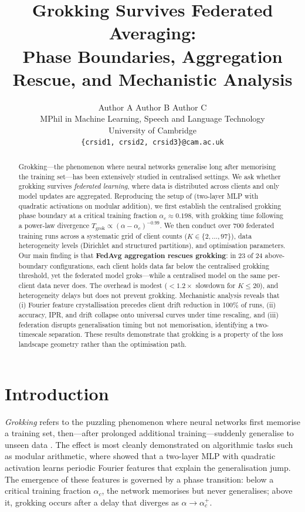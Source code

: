 \documentclass{article}
\title{Grokking Survives Federated Averaging: \\
Phase Boundaries, Aggregation Rescue, and Mechanistic Analysis}
\author{
  Author A \quad Author B \quad Author C \\
  MPhil in Machine Learning, Speech and Language Technology \\
  University of Cambridge \\
  \texttt{\{crsid1, crsid2, crsid3\}@cam.ac.uk}
}
\date{}
\begin{document}
\maketitle

\begin{abstract}
Grokking---the phenomenon where neural networks generalise long after memorising the training set---has been extensively studied in centralised settings.
We ask whether grokking survives \emph{federated learning}, where data is distributed across clients and only model updates are aggregated.
Reproducing the setup of \citet{gromov2023grokking} (two-layer MLP with quadratic activations on modular addition), we first establish the centralised grokking phase boundary at a critical training fraction $\alpha_c \approx 0.198$, with grokking time following a power-law divergence $T_{\mathrm{grok}} \propto (\alpha - \alpha_c)^{-0.99}$.
We then conduct over 700 federated training runs across a systematic grid of client counts ($K \in \{2, \ldots, 97\}$), data heterogeneity levels (Dirichlet and structured partitions), and optimisation parameters.
Our main finding is that \textbf{FedAvg aggregation rescues grokking}: in 23 of 24 above-boundary configurations, each client holds data far below the centralised grokking threshold, yet the federated model groks---while a centralised model on the same per-client data never does.
The overhead is modest ($<1.2\times$ slowdown for $K \leq 20$), and heterogeneity delays but does not prevent grokking.
Mechanistic analysis reveals that (i) Fourier feature crystallisation precedes client drift reduction in 100\% of runs, (ii) accuracy, IPR, and drift collapse onto universal curves under time rescaling, and (iii) federation disrupts generalisation timing but not memorisation, identifying a two-timescale separation.
These results demonstrate that grokking is a property of the loss landscape geometry rather than the optimisation path.
\end{abstract}


\section{Introduction}
\label{sec:intro}

\emph{Grokking} refers to the puzzling phenomenon where neural networks first memorise a training set, then---after prolonged additional training---suddenly generalise to unseen data \citep{power2022grokking}.
The effect is most cleanly demonstrated on algorithmic tasks such as modular arithmetic, where \citet{gromov2023grokking} showed that a two-layer MLP with quadratic activation learns periodic Fourier features that explain the generalisation jump.
The emergence of these features is governed by a phase transition: below a critical training fraction $\alpha_c$, the network memorises but never generalises; above it, grokking occurs after a delay that diverges as $\alpha \to \alpha_c^+$.
\end{document}
